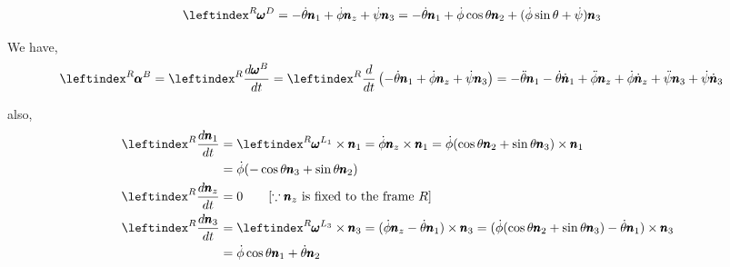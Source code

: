 \begin{align*}
    \lx{^R}{\pmb \omega}^D &= - \dot \theta \pmb n_1 + \dot \phi \pmb n_z + \dot \psi \pmb n_3
    = - \dot \theta \pmb n_1 + \dot \phi \cos \theta \pmb n_2 + (\dot \phi \sin \theta + \dot \psi) \pmb n_3
\end{align*}

We have,
\begin{align*}
    \lx{^R}{\pmb \alpha}^B &= \lx{^R}{\frac{d\pmb \omega^B}{dt}}
    =\lx{^R}{\frac{d}{dt}}\left( - \dot \theta \pmb n_1 + \dot \phi \pmb n_z + \dot \psi \pmb n_3 \right)
    = - \ddot \theta \pmb n_1 - \dot \theta \dot{\pmb n}_1
       + \ddot \phi \pmb n_z + \dot \phi \dot{\pmb n}_z
       + \ddot \psi \pmb n_3 + \dot \psi \dot{\pmb n}_3
\end{align*}

also,
\begin{align*}
    \lx{^R}{\frac{d \pmb n_1}{dt}} &= \lx{^R}{\pmb \omega}^{L_1} \times \pmb n_1 = \dot \phi \pmb n_z \times \pmb n_1 = \dot \phi (\cos \theta \pmb n_2 + \sin \theta \pmb n_3) \times \pmb n_1\\
    &= \dot \phi (-\cos \theta \pmb n_3 +\sin \theta  \pmb n_2) \\
    \lx{^R}{\frac{d \pmb n_z}{dt}} &= 0 \qquad [\because \pmb n_z \text{ is fixed to the frame } R]
    \\
    \lx{^R}{\frac{d \pmb n_3}{dt}} &=  \lx{^R}{\pmb \omega}^{L_3} \times \pmb n_3
    = (\dot \phi \pmb n_z - \dot \theta \pmb n_1 ) \times \pmb n_3
    = (\dot \phi (\cos \theta \pmb n_2 + \sin \theta \pmb n_3) - \dot \theta \pmb n_1 ) \times \pmb n_3\\
    &= \dot \phi \cos \theta \pmb n_1 + \dot \theta \pmb n_2
\end{align*}

